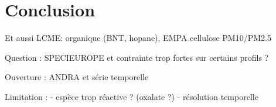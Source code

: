 \section{Conclusion}%
\label{sec:conclusion}

Et aussi LCME: organique (BNT, hopane), EMPA cellulose PM10/PM2.5

Question : SPECIEUROPE et contrainte trop fortes sur certains profils ?

Ouverture : ANDRA et série temporelle

Limitation : 
- espèce trop réactive ? (oxalate ?)
- résolution temporelle



